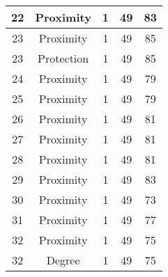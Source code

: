 \documentclass[results.tex]{subfiles}
\begin{document}
\begin{center}
\begin{tabular}{| c || c | c | c | c |}
            \hline
            22                      & Proximity                    & 1                      & 49                      & 83                   \\
            \hline
            23                      & Proximity                    & 1                      & 49                      & 85                   \\
            \hline
            23                      & Protection                   & 1                      & 49                      & 85                   \\
            \hline
            24                      & Proximity                    & 1                      & 49                      & 79                   \\
            \hline
            25                      & Proximity                    & 1                      & 49                      & 79                   \\
            \hline
            26                      & Proximity                    & 1                      & 49                      & 81                   \\
            \hline
            27                      & Proximity                    & 1                      & 49                      & 81                   \\
            \hline
            28                      & Proximity                    & 1                      & 49                      & 81                   \\
            \hline
            29                      & Proximity                    & 1                      & 49                      & 83                   \\
            \hline
            30                      & Proximity                    & 1                      & 49                      & 73                   \\
            \hline
            31                      & Proximity                    & 1                      & 49                      & 77                   \\
            \hline
            32                      & Proximity                    & 1                      & 49                      & 75                   \\
            \hline
            32                      & Degree                       & 1                      & 49                      & 75                   \\

\end{tabular}
\end{center}
\end{document}
